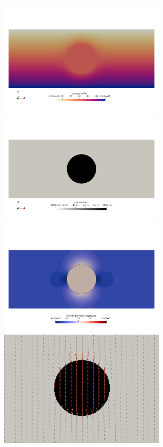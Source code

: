 \begin{center}
\includegraphics[width=8cm]{python_codes/fieldstone_128/results/experiment1/press}
\includegraphics[width=8cm]{python_codes/fieldstone_128/results/experiment1/K}\\
\includegraphics[width=8cm]{python_codes/fieldstone_128/results/experiment1/vel}
\includegraphics[width=8cm]{python_codes/fieldstone_128/results/experiment1/vel2}\\
\end{center}


